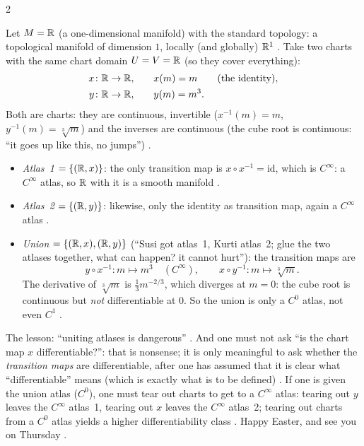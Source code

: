 \begin{paracol}{2}
\begin{example}\label{ex:dm-line}
Let $M=\mathbb{R}$ (a one-dimensional manifold) with the standard topology: a topological manifold of dimension $1$, locally (and
globally) $\mathbb{R}^1$ . Take two charts with the same chart
domain $U=V=\mathbb{R}$ (so they cover everything):
\begin{align*}
  x\colon\mathbb{R}\to\mathbb{R},&\qquad x(m)=m \qquad\text{(the identity)},\\
  y\colon\mathbb{R}\to\mathbb{R},&\qquad y(m)=m^3 .
\end{align*}
Both are charts: they are continuous, invertible ($x^{-1}(m)=m$, $y^{-1}(m)=\sqrt[3]{m}$) and the inverses are continuous
(the cube root is continuous: ``it goes up like this, no jumps'') .
\begin{itemize}
  \item \emph{Atlas~1} $=\{(\mathbb{R},x)\}$: the only transition map is $x\circ x^{-1}=\mathrm{id}$, which is $C^\infty$: a $C^\infty$
        atlas, so $\mathbb{R}$ with it is a smooth manifold .
  \item \emph{Atlas~2} $=\{(\mathbb{R},y)\}$: likewise, only the identity as transition map, again a $C^\infty$ atlas
        .
  \item \emph{Union} $=\{(\mathbb{R},x),(\mathbb{R},y)\}$ (``Susi got atlas~1, Kurti atlas~2; glue the two atlases together, what can
        happen? it cannot hurt''): the transition maps are
        \[
          y\circ x^{-1}\colon m\mapsto m^3\quad(C^\infty),\qquad x\circ y^{-1}\colon m\mapsto\sqrt[3]{m}.
        \]
        The derivative of $\sqrt[3]{m}$ is $\tfrac13 m^{-2/3}$, which diverges at $m=0$: the cube root is continuous
        but \emph{not} differentiable at $0$. So the union is only a $C^0$ atlas, not even $C^1$
        .
\end{itemize}
\end{example}
The lesson: ``uniting atlases is dangerous'' . And one must not ask ``is the chart map $x$
differentiable?'': that is nonsense; it is only meaningful to ask whether the \emph{transition maps} are differentiable, after
one has assumed that it is clear what ``differentiable'' means (which is exactly what is to be defined)
. If one is given the union atlas ($C^0$), one must tear out charts to
get to a $C^\infty$ atlas: tearing out $y$ leaves the $C^\infty$ atlas~1, tearing out $x$ leaves the $C^\infty$
atlas~2; tearing out charts from a $C^0$ atlas yields a higher differentiability class
. Happy Easter, and see you on Thursday .


\end{paracol}
